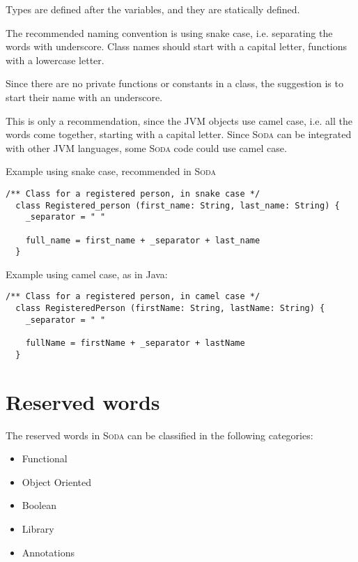 \documentclass[12pt,a4paper]{book}
\newcommand{\Soda}{\textsc{Soda}\xspace}
\begin{document}
    Types are defined after the variables, and they are statically defined.

    The recommended naming convention is using snake case, i.e. separating the words with underscore.
    Class names should start with a capital letter, functions with a lowercase letter.

    Since there are no private functions or constants in a class, the suggestion is to start their name with an underscore.

    This is only a recommendation, since the JVM objects use camel case, i.e. all the words come together, starting with a capital letter.
    Since \Soda can be integrated with other JVM languages, some \Soda code could use camel case.

    Example using snake case, recommended in \Soda

    \begin{lstlisting}[label={lst:exampleExtendsSnakeCase}]
  /** Class for a registered person, in snake case */
  class Registered_person (first_name: String, last_name: String) {
    _separator = " "

    full_name = first_name + _separator + last_name
  }
    \end{lstlisting}

    Example using camel case, as in Java:
    \begin{lstlisting}[label={lst:exampleExtendsCamelCase}]
  /** Class for a registered person, in camel case */
  class RegisteredPerson (firstName: String, lastName: String) {
    _separator = " "

    fullName = firstName + _separator + lastName
  }
    \end{lstlisting}


    \chapter{Reserved words}

    The reserved words in \Soda can be classified in the following categories:

    \begin{itemize}
        \item Functional
        \item Object Oriented
        \item Boolean
        \item Library
        \item Annotations
    \end{itemize}
\end{document}
